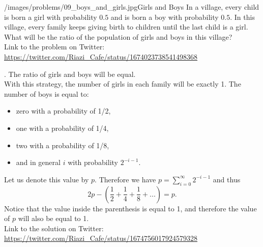 \begin{problem}{/images/problems/09_boys_and_girls.jpg}{Girls and Boys} 
    In a village, every child is born a girl with probability $0.5$ and is born a boy with probability $0.5$. In this village, every family keeps giving birth to children until the last child is a girl. What will be the ratio of the population of girls and boys in this village?\\[0.2cm]

Link to the problem on Twitter:  \url{https://twitter.com/Riazi_Cafe/status/1674023738541498368}
\end{problem}
\begin{solution}.
The ratio of girls and boys will be equal.\\[0.2cm]

With this strategy, the number of girls in each family will be exactly 1. The number of boys is equal to:

\begin{itemize}
\item zero with a probability of 1/2,
\item one with a probability of 1/4,
\item two with a probability of 1/8,
\item and in general $i$ with probability $2^{-i-1}$.
\end{itemize}

Let us denote this value by $p$. Therefore we have $p = \sum_{i=0}^{\infty} 2^{-i-1}$ and thus  $$2p - (\frac{1}{2} + \frac{1}{4} + \frac{1}{8} + ...) = p.$$
Notice that the value inside the parenthesis is equal to 1, and therefore the value of $p$ will also be equal to 1.\\[0.2cm]


Link to the solution on Twitter:  \url{https://twitter.com/Riazi_Cafe/status/1674756017924579328}
\end{solution}